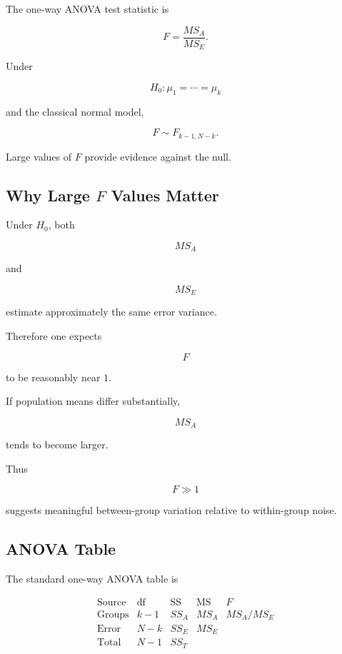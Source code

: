 The one-way ANOVA test statistic is

\[
\boxed{
F
=
\frac{
MS_A
}{
MS_E
}.
}
\]

Under

\[
H_0:
\mu_1=\cdots=\mu_k
\]

and the classical normal model,

\[
\boxed{
F
\sim
F_{k-1,N-k}.
}
\]

Large values of \(F\) provide evidence against the null.

\subsection{Why Large \(F\) Values Matter}
\label{subsec:why-large-anova-f}

Under \(H_0\), both

\[
MS_A
\]

and

\[
MS_E
\]

estimate approximately the same error variance.

Therefore one expects

\[
F
\]

to be reasonably near \(1\).

If population means differ substantially,

\[
MS_A
\]

tends to become larger.

Thus

\[
\boxed{
F\gg1
}
\]

suggests meaningful between-group variation relative to within-group
noise.

\subsection{ANOVA Table}
\label{subsec:one-way-anova-table}

The standard one-way ANOVA table is

\[
\begin{array}{c|c|c|c|c}
\text{Source}
&
\text{df}
&
\text{SS}
&
\text{MS}
&
F
\\
\hline
\text{Groups}
&
k-1
&
SS_A
&
MS_A
&
MS_A/MS_E
\\
\text{Error}
&
N-k
&
SS_E
&
MS_E
&
\\
\text{Total}
&
N-1
&
SS_T
&
&
\end{array}
\]

